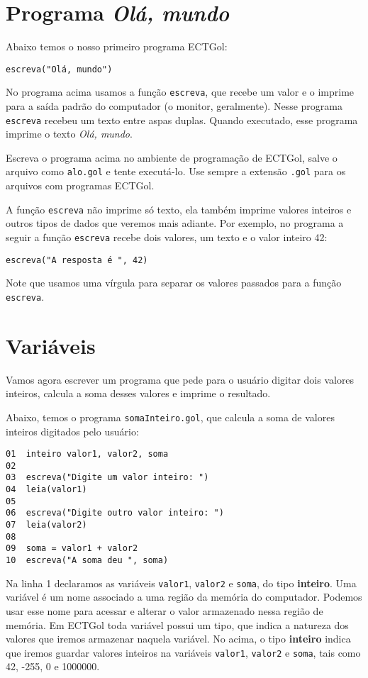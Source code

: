 \documentclass{report}
\newcommand{\Egol}{ECTGol}
\begin{document}
\section{Programa \emph{Olá, mundo}}

Abaixo temos o nosso primeiro programa \Egol:
%
\begin{verbatim}
escreva("Olá, mundo")
\end{verbatim}
%
No programa acima usamos a função \texttt{escreva},
que recebe um valor e o imprime para a saída padrão
do computador (o monitor, geralmente). Nesse programa
\texttt{escreva} recebeu um texto entre aspas duplas.
Quando executado, esse programa imprime o texto \emph{Olá, mundo}.  

Escreva o programa acima no ambiente de programação de \Egol,
salve o arquivo como \texttt{alo.gol} e tente executá-lo.
Use sempre a extensão \texttt{.gol} para os arquivos com
programas \Egol.

A função \texttt{escreva} não imprime só texto, ela também
imprime valores inteiros e outros tipos de dados que veremos
mais adiante. Por exemplo, no programa a seguir a função
\texttt{escreva} recebe dois valores, um texto e o valor
inteiro 42:
%
\begin{verbatim}
escreva("A resposta é ", 42)
\end{verbatim}
%
Note que usamos uma vírgula para separar os
valores passados para a função \texttt{escreva}.


\section{Variáveis}

Vamos agora escrever um programa que pede para o usuário
digitar dois valores inteiros, calcula a soma desses valores
e imprime o resultado.

Abaixo, temos o programa \texttt{somaInteiro.gol}, que
calcula a soma de valores inteiros digitados pelo usuário:
%
\begin{verbatim}
01  inteiro valor1, valor2, soma
02
03  escreva("Digite um valor inteiro: ")
04  leia(valor1)
05
06  escreva("Digite outro valor inteiro: ")
07  leia(valor2)
08
09  soma = valor1 + valor2
10  escreva("A soma deu ", soma)
\end{verbatim}
%
Na linha 1 declaramos as variáveis \texttt{valor1}, \texttt{valor2}
e \texttt{soma}, do tipo \textbf{inteiro}. Uma variável é um nome associado
a uma região da memória do computador. Podemos usar esse nome para
acessar e alterar o valor armazenado nessa região de memória. Em \Egol
toda variável possui um tipo, que indica a natureza dos valores que
iremos armazenar naquela variável. No acima, o tipo \textbf{inteiro}
indica que iremos guardar valores inteiros na variáveis
\texttt{valor1}, \texttt{valor2} e \texttt{soma}, tais como
42, -255, 0 e 1000000. 
\end{document}
